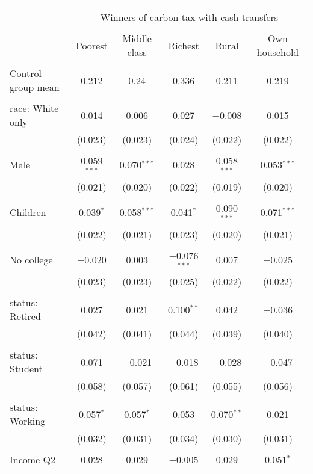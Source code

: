 
\begin{tabular}{@{\extracolsep{5pt}}lccccc} 
\\[-1.8ex]\hline 
\hline \\[-1.8ex] 
 & \multicolumn{5}{c}{Winners of carbon tax with cash transfers} \\ 
\cline{2-6} 
\\[-1.8ex] & Poorest & Middle class & Richest & Rural & Own household \\ 
\hline \\[-1.8ex] 
 Control group mean & 0.212 & 0.24 & 0.336 & 0.211 & 0.219  \\ \hline \\[-1.8ex] race: White only & 0.014 & 0.006 & 0.027 & $-$0.008 & 0.015 \\ 
  & (0.023) & (0.023) & (0.024) & (0.022) & (0.022) \\ 
  & & & & & \\ 
 Male & 0.059$^{***}$ & 0.070$^{***}$ & 0.028 & 0.058$^{***}$ & 0.053$^{***}$ \\ 
  & (0.021) & (0.020) & (0.022) & (0.019) & (0.020) \\ 
  & & & & & \\ 
 Children & 0.039$^{*}$ & 0.058$^{***}$ & 0.041$^{*}$ & 0.090$^{***}$ & 0.071$^{***}$ \\ 
  & (0.022) & (0.021) & (0.023) & (0.020) & (0.021) \\ 
  & & & & & \\ 
 No college & $-$0.020 & 0.003 & $-$0.076$^{***}$ & 0.007 & $-$0.025 \\ 
  & (0.023) & (0.023) & (0.025) & (0.022) & (0.022) \\ 
  & & & & & \\ 
 status: Retired & 0.027 & 0.021 & 0.100$^{**}$ & 0.042 & $-$0.036 \\ 
  & (0.042) & (0.041) & (0.044) & (0.039) & (0.040) \\ 
  & & & & & \\ 
 status: Student & 0.071 & $-$0.021 & $-$0.018 & $-$0.028 & $-$0.047 \\ 
  & (0.058) & (0.057) & (0.061) & (0.055) & (0.056) \\ 
  & & & & & \\ 
 status: Working & 0.057$^{*}$ & 0.057$^{*}$ & 0.053 & 0.070$^{**}$ & 0.021 \\ 
  & (0.032) & (0.031) & (0.034) & (0.030) & (0.031) \\ 
  & & & & & \\ 
 Income Q2 & 0.028 & 0.029 & $-$0.005 & 0.029 & 0.051$^{*}$ \\ 

\end{tabular}
